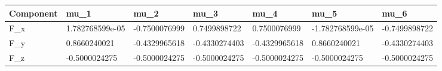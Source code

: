\begin{tabular}{@{}lllllll@{}}
\toprule
Component & mu\_1 & mu\_2 & mu\_3 & mu\_4 & mu\_5 & mu\_6 \\
\midrule
F\_x & 1.782768599e-05 & -0.7500076999 & 0.7499898722 & 0.7500076999 & -1.782768599e-05 & -0.7499898722 \\
F\_y & 0.8660240021 & -0.4329965618 & -0.4330274403 & -0.4329965618 & 0.8660240021 & -0.4330274403 \\
F\_z & -0.5000024275 & -0.5000024275 & -0.5000024275 & -0.5000024275 & -0.5000024275 & -0.5000024275 \\
\bottomrule
\end{tabular}
